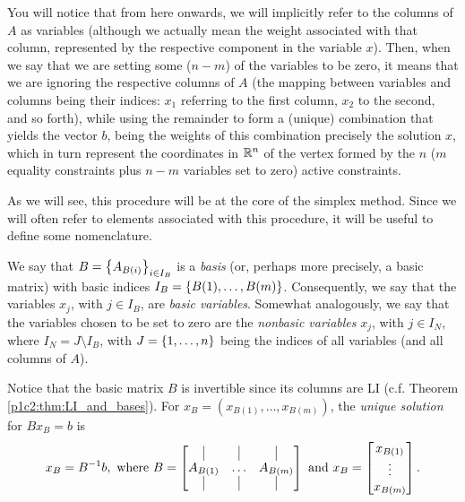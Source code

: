 You will notice that from here onwards, we will implicitly refer to the columns of $A$ as variables (although we actually mean the weight associated with that column, represented by the respective component in the variable $x$). Then, when we say that we are setting some ($n-m$) of the variables to be zero, it means that we are ignoring the respective columns of $A$ (the mapping between variables and columns being their indices: $x_1$ referring to the first column, $x_2$ to the second, and so forth), while using the remainder to form a (unique) combination that yields the vector $b$, being the weights of this combination precisely the solution $x$, which in turn represent the coordinates in $\mathbb{R}^n$ of the vertex formed by the $n$ ($m$ equality constraints plus $n-m$ variables set to zero) active constraints.   

As we will see, this procedure will be at the core of the simplex method. Since we will often refer to elements associated with this procedure, it will be useful to define some nomenclature.

We say that $B = \left\{ A_{B(i)} \right \}_{i \in I_B}$ is a \emph{basis} (or, perhaps more precisely, a basic matrix) with basic indices $I_B = \left\{ B(1), \dots, B(m) \right \}$. Consequently, we say that the variables $x_j$, with $j \in I_B$, are \emph{basic variables}. Somewhat analogously, we say that the variables chosen to be set to zero are the \emph{nonbasic variables} $x_j$, with $j \in I_N$, where $I_N = J \setminus I_B$, with $J = \left\{ 1, \dots, n \right \}$ being the indices of all variables (and all columns of $A$).
 
 Notice that the basic matrix $B$ is invertible since its columns are LI (c.f. Theorem \ref{p1c2:thm:LI_and_bases}). For $x_B = (x_{B(1)}, \dots, x_{B(m)})$, the \emph{unique solution} for $Bx_B = b$ is 
%
\begin{equation*}
	x_B = B^{-1}b, \text{ where } 
	B = \begin{bmatrix} \vline & \vline & \vline \\
					  A_{B(1)} & \dots & A_{B(m)} \\
	    	    		\vline & \vline & \vline	
		\end{bmatrix} \text{ and } 
	x_B =  \begin{bmatrix}   x_{B(1)} \\
		 			     		 \vdots   \\
		 			     		 x_{B(m)}	
		   \end{bmatrix}.
\end{equation*}
%

